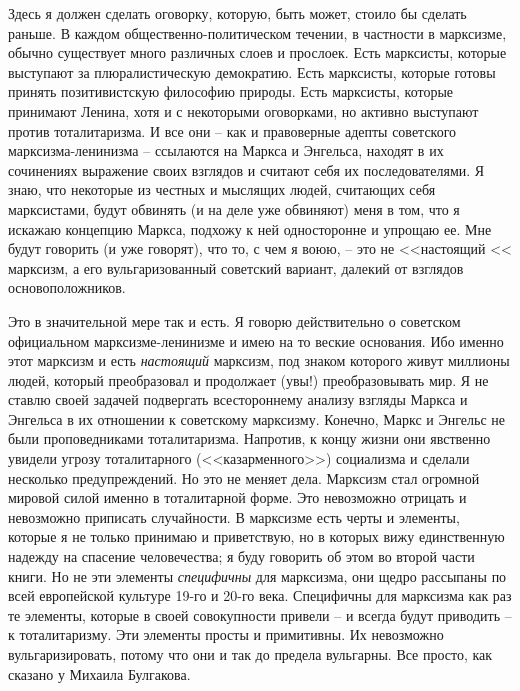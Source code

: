 \documentclass{book}
\begin{document}
Здесь я должен сделать оговорку, которую, быть может, стоило бы сделать раньше. В каждом общественно-политиче­ском течении, в 
частности в марксизме, обычно существует много различных слоев и прослоек. Есть марксисты, которые выступают за плюралистическую 
демократию. Есть марксисты, которые готовы принять позитивистскую философию природы. Есть марксисты, которые принимают Ленина, 
хотя и с некоторыми оговорками, но активно выступают против тоталитаризма. И все они -- как и правоверные адепты советского 
марксизма-ленинизма -- ссылаются на Маркса и Энгельса, находят в их сочинениях выражение своих взглядов и считают себя их 
последователями. Я знаю, что некоторые из честных и мыслящих людей, считающих себя марксистами, будут обвинять (и на деле уже 
обвиняют) меня в том, что я искажаю концеп­цию Маркса, подхожу к ней односторонне и упрощаю ее. Мне будут говорить (и уже 
говорят), что то, с чем я воюю, -- это не <<настоящий << марксизм, а его вульгаризованный советский вариант, далекий от взглядов 
основоположников.

Это в значительной мере так и есть. Я говорю действитель­но о советском официальном марксизме-ленинизме и имею на то веские 
основания. Ибо именно этот марксизм и есть \textit{насто­ящий}  марксизм, под знаком которого живут миллионы людей, который 
преобразовал и продолжает (увы!) преобразовывать мир. Я не ставлю своей задачей подвергать всестороннему ана­лизу взгляды Маркса 
и Энгельса в их отношении к советскому марксизму. Конечно, Маркс и Энгельс не были проповедниками тоталитаризма. Напротив, к 
концу жизни они явственно увиде­ли угрозу тоталитарного (<<казарменного>>) социализма и сдела­ли несколько предупреждений. Но это 
не меняет дела. Марк­сизм стал огромной мировой силой именно в тоталитарной фор­ме. Это невозможно отрицать и невозможно приписать 
случай­ности. В марксизме есть черты и элементы, которые я не толь­ко принимаю и приветствую, но в которых вижу единственную 
надежду на спасение человечества; я буду говорить об этом во второй части книги. Но не эти элементы \textit{специфичны}  для 
марксизма, они щедро рассыпаны по всей европейской культуре 19-го и 20-го века. Специфичны для марксизма как раз те эле­менты, 
которые в своей совокупности привели -- и всегда будут приводить -- к тоталитаризму. Эти элементы просты и примитивны. Их 
невозможно вульгаризировать, потому что они и так до предела вульгарны. Все просто, как сказано у Михаила Булгакова.
\end{document}
